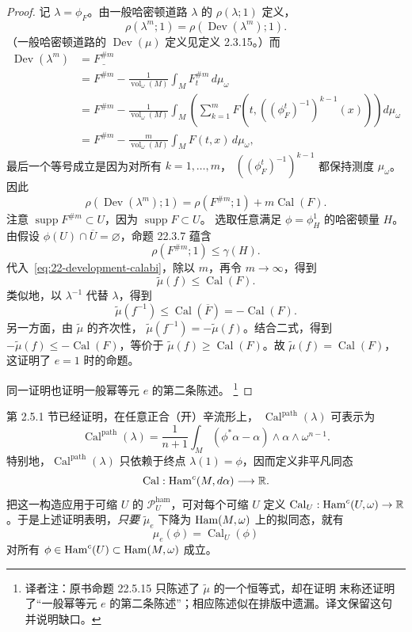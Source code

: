 \begin{proof}
记 $\lambda=\phi_F$。由一般哈密顿道路 $\lambda$ 的 $\rho(\lambda;1)$ 定义，
\[
 \rho(\lambda^m;1)=\rho(\operatorname{Dev}(\lambda^m);1).
\]
（一般哈密顿道路的 $\operatorname{Dev}(\mu)$ 定义见定义 2.3.15。）而
\begin{align*}
 \operatorname{Dev}(\lambda^m)
 &=\underline{F^{\#m}}\\
 &=F^{\#m}-\frac1{\operatorname{vol}_\omega(M)}\int_M F_t^{\#m}\,d\mu_\omega\\
 &=F^{\#m}-\frac1{\operatorname{vol}_\omega(M)}
   \int_M\left(\sum_{k=1}^mF(t,((\phi_F^t)^{-1})^{k-1}(x))\right)d\mu_\omega\\
 &=F^{\#m}-\frac m{\operatorname{vol}_\omega(M)}\int_MF(t,x)\,d\mu_\omega,
\end{align*}
最后一个等号成立是因为对所有 $k=1,\ldots,m$，
$((\phi_F^t)^{-1})^{k-1}$ 都保持测度 $\mu_\omega$。因此
\begin{equation}
 \rho(\operatorname{Dev}(\lambda^m);1)
 =\rho(F^{\#m};1)+m\operatorname{Cal}(F).
 \label{eq:22-development-calabi}
\end{equation}
注意 $\operatorname{supp}F^{\#m}\subset U$，因为 $\operatorname{supp}F\subset U$。
选取任意满足 $\phi=\phi_H^1$ 的哈密顿量 $H$。由假设
$\phi(U)\cap\overline U=\varnothing$，命题 22.3.7 蕴含
\[
 \rho(F^{\#m};1)\leq\gamma(H).
\]
代入~\eqref{eq:22-development-calabi}，除以 $m$，再令 $m\to\infty$，得到
\[
 \widetilde\mu(f)\leq\operatorname{Cal}(F).
\]
类似地，以 $\lambda^{-1}$ 代替 $\lambda$，得到
\[
 \widetilde\mu(f^{-1})\leq\operatorname{Cal}(\overline F)
 =-\operatorname{Cal}(F).
\]
另一方面，由 $\widetilde\mu$ 的齐次性，
$\widetilde\mu(f^{-1})=-\widetilde\mu(f)$。结合二式，得到
$-\widetilde\mu(f)\leq-\operatorname{Cal}(F)$，等价于
$\widetilde\mu(f)\geq\operatorname{Cal}(F)$。故
$\widetilde\mu(f)=\operatorname{Cal}(F)$，这证明了 $e=1$ 时的命题。

同一证明也证明一般幂等元 $e$ 的第二条陈述。
\footnote{译者注：原书命题 22.5.15 只陈述了 $\widetilde\mu$ 的一个恒等式，却在证明
末称还证明了“一般幂等元 $e$ 的第二条陈述”；相应陈述似在排版中遗漏。译文保留这句
并说明缺口。}
\end{proof}

\begin{remark}
\label{rem:22-calabi-endpoint}
第 2.5.1 节已经证明，在任意正合（开）辛流形上，
$\operatorname{Cal}^{\mathrm{path}}(\lambda)$ 可表示为
\begin{equation}
 \operatorname{Cal}^{\mathrm{path}}(\lambda)
 =\frac1{n+1}\int_M(\phi^*\alpha-\alpha)\wedge\alpha\wedge\omega^{n-1}.
 \label{eq:22-calabi-endpoint-formula}
\end{equation}
特别地，$\operatorname{Cal}^{\mathrm{path}}(\lambda)$ 只依赖于终点
$\lambda(1)=\phi$，因而定义非平凡同态
\[
 \operatorname{Cal}:\operatorname{Ham}^c(M,d\alpha)\longrightarrow\mathbb R.
\]
把这一构造应用于可缩 $U$ 的 $\mathcal P_U^{\mathrm{ham}}$，可对每个可缩 $U$ 定义
$\operatorname{Cal}_U:\operatorname{Ham}^c(U,\omega)\to\mathbb R$。于是上述证明表明，\emph{只要}
$\widetilde\mu_e$ 下降为 $\operatorname{Ham}(M,\omega)$ 上的拟同态，就有
\[
 \mu_e(\phi)=\operatorname{Cal}_U(\phi)
\]
对所有 $\phi\in\operatorname{Ham}^c(U)\subset\operatorname{Ham}(M,\omega)$ 成立。
\end{remark}

